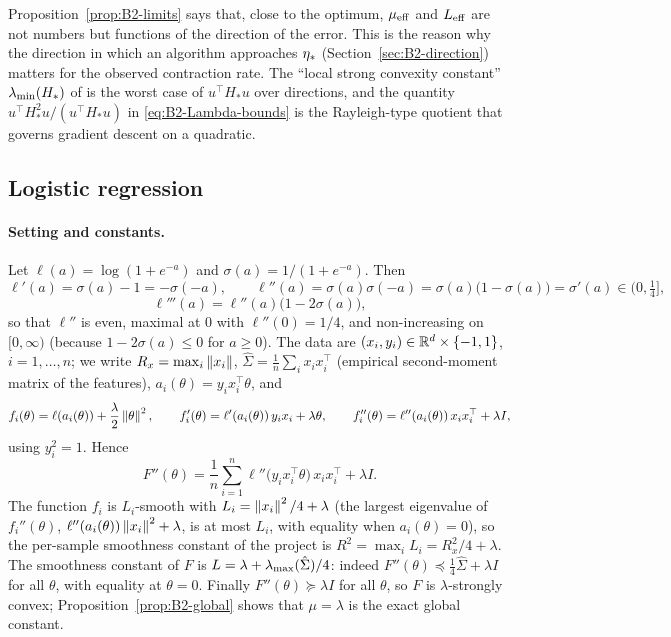 \begin{remark}
Proposition~\ref{prop:B2-limits} says that, close to the optimum, $\mu_{\mathrm{eff}}$ and $L_{\mathrm{eff}}$ are not numbers but
functions of the direction of the error. This is the reason why the direction in which an algorithm approaches
$\eta_\ast$ (Section~\ref{sec:B2-direction}) matters for the observed contraction rate. The ``local
strong convexity constant'' $\lambda_{\min}(H_\ast)$ of \cite{bach2014adaptivity} is the worst case of
$u^\top H_\ast u$ over directions, and the quantity $u^\top H_\ast^2u/(u^\top H_\ast u)$ in
\eqref{eq:B2-Lambda-bounds} is the Rayleigh-type quotient that governs gradient descent on a quadratic.
\end{remark}

\subsection{Logistic regression}\label{sec:B2-logistic}

\paragraph{Setting and constants.}
Let $\ell(a)=\log(1+e^{-a})$ and $\sigma(a)=1/(1+e^{-a})$. Then
\[
\ell'(a)=\sigma(a)-1=-\sigma(-a),\qquad
\ell''(a)=\sigma(a)\sigma(-a)=\sigma(a)\big(1-\sigma(a)\big)=\sigma'(a)\in(0,\tfrac14],
\]
\[
\ell'''(a)=\ell''(a)\big(1-2\sigma(a)\big),
\]
so that $\ell''$ is even, maximal at $0$ with $\ell''(0)=1/4$, and non-increasing on $[0,\infty)$ (because
$1-2\sigma(a)\le0$ for $a\ge0$). The data are $(x_i,y_i)\in\mathbb{R}^d\times\{-1,1\}$, $i=1,\dots,n$; we write
$R_x=\max_i\left\|x_i\right\|$, $\hat\Sigma=\frac1n\sum_ix_ix_i^\top$ (empirical second-moment matrix of the features),
$a_i(\theta)=y_ix_i^\top\theta$, and
\[
f_i(\theta)=\ell(a_i(\theta))+\frac\lambda2\left\|\theta\right\|^2,\qquad
f'_i(\theta)=\ell'(a_i(\theta))\,y_ix_i+\lambda\theta,\qquad
f_i''(\theta)=\ell''(a_i(\theta))\,x_ix_i^\top+\lambda I ,
\]
using $y_i^2=1$. Hence
\begin{equation}\label{eq:B2-logistic-hessian}
F''(\theta)=\frac1n\sum_{i=1}^n\ell''\big(y_ix_i^\top\theta\big)\,x_ix_i^\top+\lambda I .
\end{equation}
The function $f_i$ is $L_i$-smooth with $L_i=\left\|x_i\right\|^2/4+\lambda$ (the largest eigenvalue of
$f_i''(\theta)$, $\ell''(a_i(\theta))\left\|x_i\right\|^2+\lambda$, is at most $L_i$, with equality when $a_i(\theta)=0$), so the
per-sample smoothness constant of the project is $R^2=\max_iL_i=R_x^2/4+\lambda$. The smoothness constant of
$F$ is $L=\lambda+\lambda_{\max}(\hat\Sigma)/4$: indeed $F''(\theta)\preccurlyeq\frac14\hat\Sigma+\lambda I$ for all
$\theta$, with equality at $\theta=0$. Finally $F''(\theta)\succcurlyeq\lambda I$ for all $\theta$, so $F$ is
$\lambda$-strongly convex; Proposition~\ref{prop:B2-global} shows that $\mu=\lambda$ is the exact global constant.


